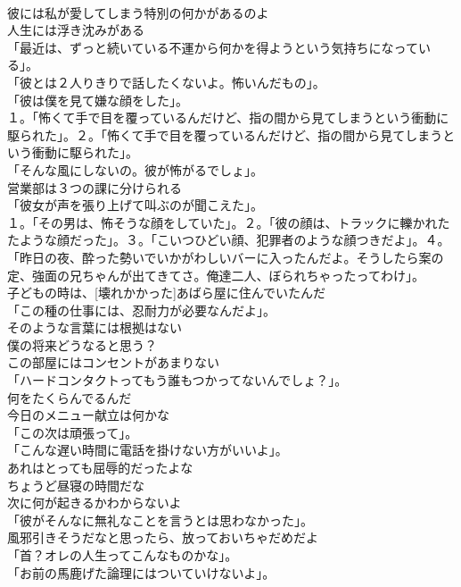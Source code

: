 \documentclass[8pt]{extreport}
\begin{document}
\begin{CJK}{UTF8}{min}
\\	彼には私が愛してしまう特別の何かがあるのよ	
\\	人生には浮き沈みがある	
\\	「最近は、ずっと続いている不運から何かを得ようという気持ちになっている」。	
\\	「彼とは２人りきりで話したくないよ。怖いんだもの」。	
\\	「彼は僕を見て嫌な顔をした」。	
\\	１。「怖くて手で目を覆っているんだけど、指の間から見てしまうという衝動に駆られた」。２。「怖くて手で目を覆っているんだけど、指の間から見てしまうという衝動に駆られた」。	
\\	「そんな風にしないの。彼が怖がるでしょ」。	
\\	営業部は３つの課に分けられる	
\\	「彼女が声を張り上げて叫ぶのが聞こえた」。	
\\	１。「その男は、怖そうな顔をしていた」。２。「彼の顔は、トラックに轢かれたたような顔だった」。３。「こいつひどい顔、犯罪者のような顔つきだよ」。４。「昨日の夜、酔った勢いでいかがわしいバーに入ったんだよ。そうしたら案の定、強面の兄ちゃんが出てきてさ。俺達二人、ぼられちゃったってわけ」。	
\\	子どもの時は、[壊れかかった]あばら屋に住んでいたんだ	
\\	「この種の仕事には、忍耐力が必要なんだよ」。	
\\	そのような言葉には根拠はない	
\\	僕の将来どうなると思う？	
\\	この部屋にはコンセントがあまりない	
\\	「ハードコンタクトってもう誰もつかってないんでしょ？」。	
\\	何をたくらんでるんだ	
\\	今日のメニュー献立は何かな	
\\	「この次は頑張って」。	
\\	「こんな遅い時間に電話を掛けない方がいいよ」。	
\\	あれはとっても屈辱的だったよな	
\\	ちょうど昼寝の時間だな	
\\	次に何が起きるかわからないよ	
\\	「彼がそんなに無礼なことを言うとは思わなかった」。	
\\	風邪引きそうだなと思ったら、放っておいちゃだめだよ	
\\	「首？オレの人生ってこんなものかな」。	
\\	「お前の馬鹿げた論理にはついていけないよ」。	

\end{CJK}
\end{document}
